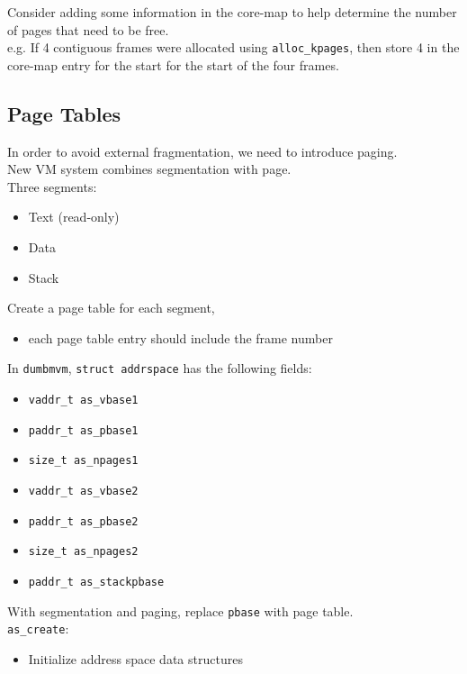 \documentclass[12pt]{article}
\theoremstyle{plain}
\theoremstyle{definition}
\begin{document}
Consider adding some information in the core-map to help determine the number of pages that need to be free. \\
e.g. If 4 contiguous frames were allocated using \texttt{alloc\_kpages}, then store 4 in the core-map entry for the start for the start of the four frames.

\subsection{Page Tables}
In order to avoid external fragmentation, we need to introduce paging. \\
New VM system combines segmentation with page. \\
Three segments:
\begin{itemize}
  \item Text (read-only)
  \item Data
  \item Stack
\end{itemize}
Create a page table for each segment,
\begin{itemize}
  \item each page table entry should include the frame number
\end{itemize}

In \texttt{dumbmvm}, \texttt{struct addrspace} has the following fields:
\begin{itemize}
  \item \texttt{vaddr\_t as\_vbase1}
  \item \texttt{paddr\_t as\_pbase1}
  \item \texttt{size\_t as\_npages1}

  \item \texttt{vaddr\_t as\_vbase2}
  \item \texttt{paddr\_t as\_pbase2}
  \item \texttt{size\_t as\_npages2}

  \item \texttt{paddr\_t as\_stackpbase}
\end{itemize}

With segmentation and paging, replace \texttt{pbase} with page table. \\

\texttt{as\_create}:
\begin{itemize}
  \item Initialize address space data structures
\end{itemize}
\end{document}
